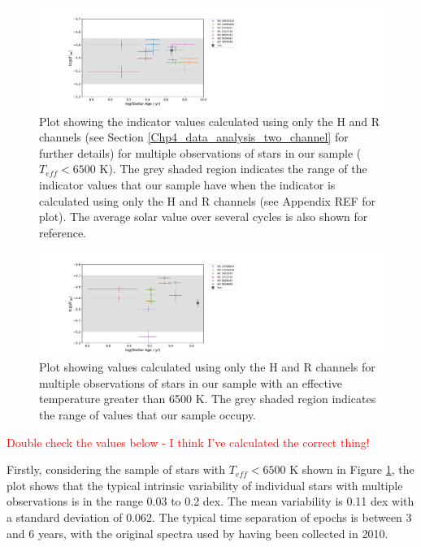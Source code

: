 \begin{figure}
    \centering
    \includegraphics[scale=0.55]{Figures/4-Chromospheric_age/cool_multiple_obs_plot_with_sun.pdf}
    \caption[Plot showing activity over several epochs for stars with $T_{eff} < 6500$ K]{Plot showing the \Rprime indicator values calculated using only the H and R channels (see Section \ref{Chp4_data_analysis_two_channel} for further details) for multiple observations of stars in our sample ($T_{eff} < 6500$ K). The grey shaded region indicates the range of the \Rprime indicator values that our sample have when the \Rprime indicator is calculated using only the H and R channels (see Appendix REF for plot). The average solar value over several cycles \citep{Egeland_etal_2017} is also shown for reference.}
    \label{fig:ca_multiple_obs}
\end{figure}

\begin{figure}
    \centering
    \includegraphics[scale=0.55]{Figures/4-Chromospheric_age/hot_multiple_obs_plot_with_sun.pdf}
    \caption[Plot showing activity over several epochs for stars with $T_{eff} > 6500$ K]{Plot showing \Rprime values calculated using only the H and R channels for multiple observations of stars in our sample with an effective temperature greater than 6500 K. The grey shaded region indicates the range of \Rprime values that our sample occupy.}
    \label{fig:ca_multiple_obs_hot_Fstars}
\end{figure}

\textcolor{red}{Double check the values below - I think I've calculated the correct thing!}

Firstly, considering the sample of stars with $T_{eff} < 6500$ K shown in Figure \ref{fig:ca_multiple_obs}, the plot shows that the typical intrinsic variability of individual stars with multiple observations is in the range 0.03 to 0.2 dex. The mean variability is 0.11 dex with a standard deviation of 0.062. The typical time separation of epochs is between 3 and 6 years, with the original spectra used by \citet{Bruntt_etal_2012} having been collected in 2010.

